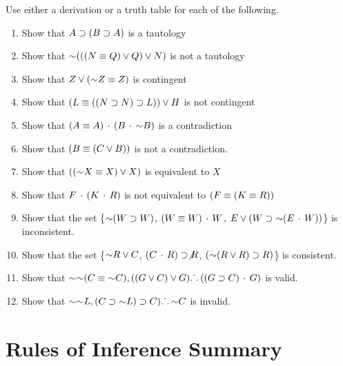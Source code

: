 {\noindent\problempart Use either a derivation or a truth table for each of the following. 
\begin{enumerate}[label=(\arabic*)]
\item Show that $A \supset (B \supset A)$ is a tautology
\item Show that $\mathord{\sim} (((N \equiv Q) \vee Q) \vee N)$ is not a tautology
\item Show that $ Z \vee (\mathord{\sim} Z \equiv Z) $ is contingent
\item Show that $ (L \equiv ((N \supset N) \supset L)) \vee H $ is not contingent
\item Show that $ (A \equiv A) \,\cdot\, (B \,\cdot\, \mathord{\sim} B)$ is a contradiction
\item Show that $ (B \equiv (C \vee B)) $ is not a contradiction.
\item Show that $ ((\mathord{\sim} X \equiv X) \vee X) $ is equivalent to $X$
\item Show that $F \,\cdot\, (K \,\cdot\, R) $ is not equivalent to $ (F \equiv (K \equiv R)) $
\item Show that the set \{$ \mathord{\sim} (W \supset W)$, $(W \equiv W) \,\cdot\, W$, $E \vee (W \supset \mathord{\sim} (E \,\cdot\, W))$\} is inconsistent.
\item Show that the set  \{$\mathord{\sim} R \vee C $, $(C \,\cdot\, R) \supset \not R$, $(\mathord{\sim} (R \vee R) \supset R) $\} is consistent.
\item Show that $\mathord{\sim} \mathord{\sim} (C \equiv \mathord{\sim} C), ((G \vee C) \vee G) \ldotp\dot{}\,\ldotp ((G \supset C) \,\cdot\, G) $ is valid.
\item Show that $ \mathord{\sim} \mathord{\sim} L,  (C \supset \mathord{\sim} L) \supset C) \ldotp\dot{}\,\ldotp \mathord{\sim} C$ is invalid. 
\end{enumerate}




}{}


\section*{Rules of Inference Summary}
\label{sec:proof_rules}

